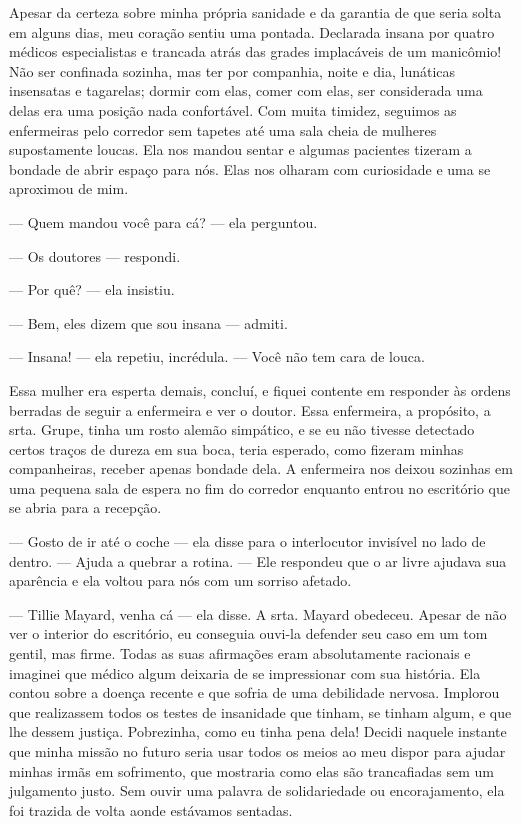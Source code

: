 
Apesar da certeza sobre minha própria sanidade e da garantia de que seria solta
em alguns dias, meu coração sentiu uma pontada. Declarada insana por
quatro médicos especialistas e trancada atrás das grades implacáveis de
um manicômio! Não ser confinada sozinha, mas ter por companhia, noite e
dia, lunáticas insensatas e tagarelas; dormir com elas, comer com elas,
ser considerada uma delas era uma posição nada confortável. Com muita
timidez, seguimos as enfermeiras pelo corredor sem tapetes até uma sala
cheia de mulheres supostamente loucas. Ela nos mandou sentar e algumas
pacientes tizeram a bondade de abrir espaço para nós. Elas nos olharam
com curiosidade e uma se aproximou de mim.

--- Quem mandou você para cá? --- ela perguntou.

--- Os doutores --- respondi.

--- Por quê? --- ela insistiu.

--- Bem, eles dizem que sou insana --- admiti.

--- Insana! --- ela repetiu, incrédula. --- Você não tem cara de louca.

Essa mulher era esperta demais, concluí, e fiquei contente em responder
às ordens berradas de seguir a enfermeira e ver o doutor. Essa
enfermeira, a propósito, a srta. Grupe, tinha um rosto alemão simpático,
e se eu não tivesse detectado certos traços de dureza em sua boca, teria
esperado, como fizeram minhas companheiras, receber apenas bondade dela.
A enfermeira nos deixou sozinhas em uma pequena sala de espera no fim do
corredor enquanto entrou no escritório que se abria para a recepção.

--- Gosto de ir até o coche --- ela disse para o interlocutor invisível
no lado de dentro. --- Ajuda a quebrar a rotina. --- Ele respondeu que o
ar livre ajudava sua aparência e ela voltou para nós com um sorriso
afetado.


--- Tillie Mayard, venha cá --- ela disse. A srta. Mayard obedeceu. Apesar
de não ver o interior do escritório, eu conseguia ouvi-la defender seu
caso em um tom gentil, mas firme. Todas as suas afirmações eram
absolutamente racionais e imaginei que médico algum deixaria de se
impressionar com sua história. Ela contou sobre a doença recente e que
sofria de uma debilidade nervosa. Implorou que realizassem todos os
testes de insanidade que tinham, se tinham algum, e que lhe dessem
justiça. Pobrezinha, como eu tinha pena dela! Decidi naquele instante
que minha missão no futuro seria usar todos os meios ao meu dispor para
ajudar minhas irmãs em sofrimento, que mostraria como elas são
trancafiadas sem um julgamento justo. Sem ouvir uma palavra de
solidariedade ou encorajamento, ela foi trazida de volta aonde estávamos
sentadas.

